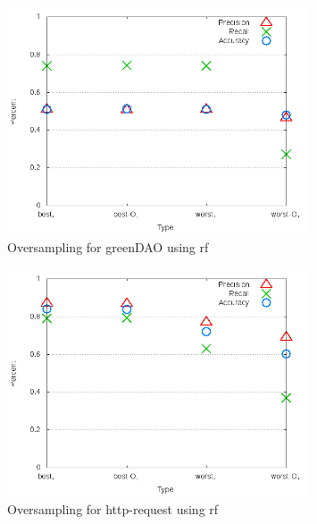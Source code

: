 \begin{figure}[!t]
\centering
\includegraphics[width=0.8\textwidth]{images/rf/test_4/greenDAO_sample_range.png}
\caption{Oversampling for greenDAO using \gls{rf}}
\label{fig:test_4_greenDAO_rf}
\end{figure}

\begin{figure}[!t]
\centering
\includegraphics[width=0.8\textwidth]{images/rf/test_4/http-request_sample_range.png}
\caption{Oversampling for http-request using \gls{rf}}
\label{fig:test_4_http-request_rf}
\end{figure}

